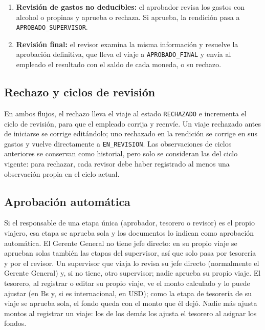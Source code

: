 \documentclass[11pt,letterpaper]{article}
\newcommand{\code}[1]{\nolinkurl{#1}}
\begin{document}
\begin{enumerate}
  Puede observar gastos individuales, exportar la planilla en Excel y aprobar o rechazar. Si aprueba y la rendición tiene gastos no deducibles, pasa a \code{EN_REVISION_APROBADOR}; en caso contrario, a \code{APROBADO_SUPERVISOR}.
  \item \textbf{Revisión de gastos no deducibles:} el aprobador revisa los gastos con alcohol o propinas y aprueba o rechaza. Si aprueba, la rendición pasa a \code{APROBADO_SUPERVISOR}.
  \item \textbf{Revisión final:} el revisor examina la misma información y resuelve la aprobación definitiva, que lleva el viaje a \code{APROBADO_FINAL} y envía al empleado el resultado con el saldo de cada moneda, o su rechazo.
\end{enumerate}

\subsection{Rechazo y ciclos de revisión}
En ambos flujos, el rechazo lleva el viaje al estado \code{RECHAZADO} e incrementa el ciclo de revisión, para que el empleado corrija y reenvíe. Un viaje rechazado antes de iniciarse se corrige editándolo; uno rechazado en la rendición se corrige en sus gastos y vuelve directamente a \code{EN_REVISION}. Las observaciones de ciclos anteriores se conservan como historial, pero solo se consideran las del ciclo vigente: para rechazar, cada revisor debe haber registrado al menos una observación propia en el ciclo actual.

\subsection{Aprobación automática}
Si el responsable de una etapa única (aprobador, tesorero o revisor) es el propio viajero, esa etapa se aprueba sola y los documentos lo indican como aprobación automática. El Gerente General no tiene jefe directo: en su propio viaje se aprueban solas también las etapas del supervisor, así que solo pasa por tesorería y por el revisor. Un supervisor que viaja lo revisa su jefe directo (normalmente el Gerente General) y, si no tiene, otro supervisor; nadie aprueba su propio viaje. El tesorero, al registrar o editar su propio viaje, ve el monto calculado y lo puede ajustar (en Bs y, si es internacional, en USD); como la etapa de tesorería de su viaje se aprueba sola, el fondo queda con el monto que él dejó. Nadie más ajusta montos al registrar un viaje: los de los demás los ajusta el tesorero al asignar los fondos.
\end{document}
